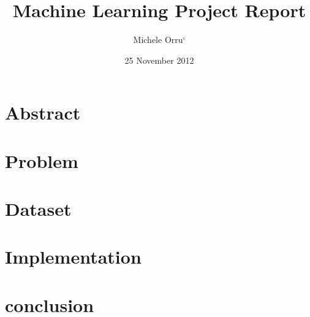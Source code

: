 \documentclass[10pt]{article}
\title{\textbf{Machine Learning Project Report }}
\author{Michele Orru`}
\date{25 November 2012}
\begin{document}
\maketitle

\section{Abstract}
\section{Problem}
\section{Dataset}
\section{Implementation}

\section{conclusion}
\end{document}
